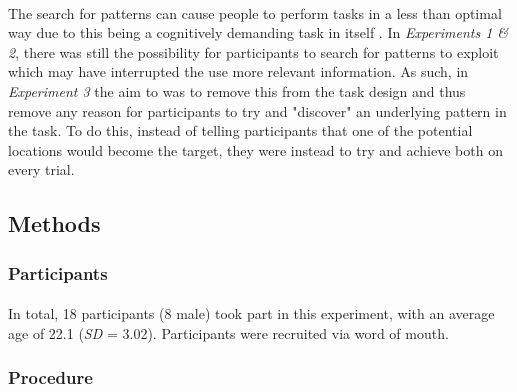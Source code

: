 \documentclass[12pt]{article}
\begin{document}
\paragraph{} The search for patterns can cause people to perform tasks in a less than optimal way due to this being a cognitively demanding task in itself \citep{wolford2004searching}. In \textit{Experiments 1 \& 2}, there was still the possibility for participants to search for patterns to exploit which may have interrupted the use more relevant information. As such, in \textit{Experiment 3} the aim to was to remove this from the task design and thus remove any reason for participants to try and "discover" an underlying pattern in the task. To do this, instead of telling participants that one of the potential locations would become the target, they were instead to try and achieve both on every trial. 


\subsection*{Methods}
\subsubsection*{Participants}
\paragraph{} In total, 18 participants (8 male) took part in this experiment, with an average age of 22.1 (\textit{SD} = 3.02). Participants were recruited via word of mouth.

\subsubsection*{Procedure}
\end{document}
